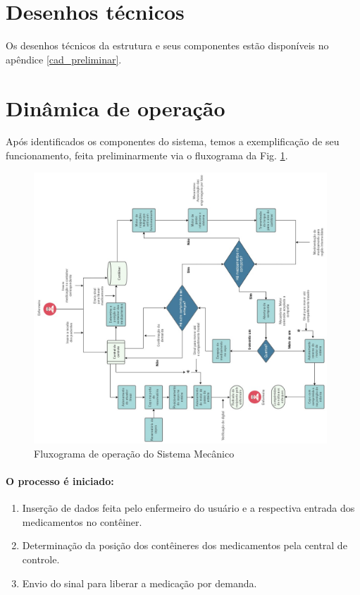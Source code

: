 
\section{Desenhos técnicos}
Os desenhos técnicos da estrutura e seus componentes estão disponíveis no apêndice \ref{cad_preliminar}.

\section{Dinâmica de operação}
\label{sec:dinamica_operacao}

Após identificados os componentes do sistema, temos a exemplificação de seu funcionamento, feita preliminarmente via o fluxograma da Fig. \ref{fig:FEst}.

\begin{figure}[ht] 
        \centering
        \includegraphics[width=0.98\textwidth, angle = -90]{figuras/estrutura/FEstrV35.jpg}
        \caption{Fluxograma de operação do Sistema Mecânico}
        \label{fig:FEst}
    \end{figure}

\paragraph*{O processo é iniciado:}

\begin{enumerate}
    \item[1.] Inserção de dados feita pelo enfermeiro do usuário e a respectiva entrada dos medicamentos no contêiner.
    \item[2.] Determinação da posição dos contêineres dos medicamentos pela central de controle.
    \item[3.] Envio do sinal para liberar a medicação por demanda.
    \end{enumerate} 
   
